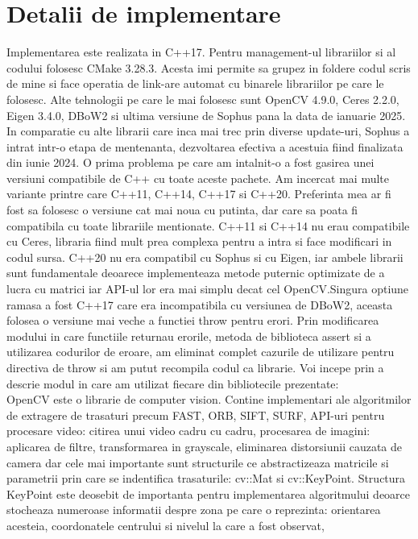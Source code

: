 \documentclass[12pt,a4paper]{report}
\begin{document}
\chapter{Detalii de implementare}
Implementarea este realizata in C++17. Pentru management-ul librariilor si al codului folosesc
CMake 3.28.3. Acesta imi permite sa grupez in foldere codul scris de mine si face operatia de 
link-are automat cu binarele librariilor pe care le folosesc. Alte tehnologii pe care le 
mai folosesc sunt OpenCV 4.9.0, Ceres 2.2.0, Eigen 3.4.0, DBoW2 si ultima versiune de Sophus
pana la data de ianuarie 2025. In comparatie cu alte librarii care inca mai trec 
prin diverse update-uri, Sophus a intrat intr-o etapa de mentenanta, dezvoltarea efectiva a 
acestuia fiind finalizata din iunie 2024. O prima problema pe care am intalnit-o a fost gasirea 
unei versiuni compatibile de C++ cu toate aceste pachete. Am incercat mai multe variante printre 
care C++11, C++14, C++17 si C++20. Preferinta mea ar fi fost sa folosesc o versiune cat mai noua
cu putinta, dar care sa poata fi compatibila cu toate librariile mentionate. C++11 si C++14 nu 
erau compatibile cu Ceres, libraria fiind mult prea complexa pentru a intra si face modificari in
codul sursa. C++20 nu era compatibil cu Sophus si cu Eigen, iar ambele librarii sunt fundamentale 
deoarece implementeaza metode puternic optimizate de a lucra cu matrici iar API-ul lor era mai 
simplu decat cel OpenCV.\@ Singura optiune ramasa a fost C++17 care era incompatibila cu versiunea 
de DBoW2, aceasta folosea o versiune mai veche a functiei throw pentru erori. Prin modificarea
modului in care functiile returnau erorile, metoda de biblioteca assert si a 
utilizarea codurilor de eroare, am eliminat complet cazurile de utilizare pentru directiva de throw
si am putut recompila codul ca librarie. Voi incepe prin a descrie modul in care am utilizat 
fiecare din bibliotecile prezentate: \\
OpenCV este o librarie de computer vision. Contine implementari ale algoritmilor de extragere de
trasaturi precum FAST, ORB, SIFT, SURF, API-uri pentru procesare video: citirea unui video cadru
cu cadru, procesarea de imagini: aplicarea de filtre, transformarea in grayscale, eliminarea distorsiunii
cauzata de camera dar cele mai importante sunt structurile ce abstractizeaza matricile si parametrii 
prin care se indentifica trasaturile: cv::Mat si cv::KeyPoint. Structura KeyPoint este deosebit de
importanta pentru implementarea algoritmului deoarce stocheaza numeroase informatii despre zona
pe care o reprezinta: orientarea acesteia, coordonatele centrului si nivelul la care a fost observat, 
\end{document}
